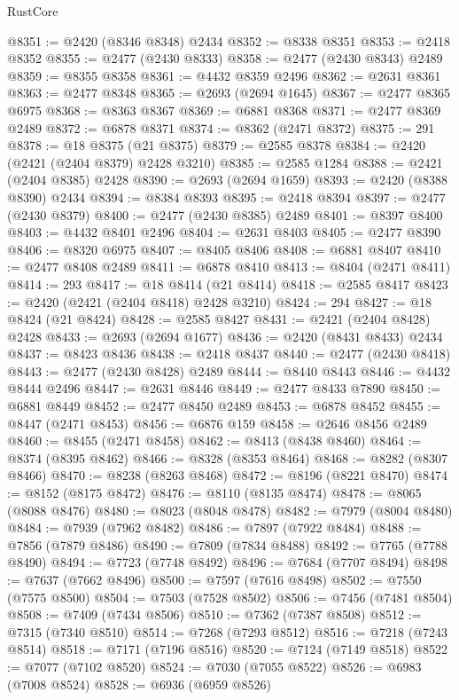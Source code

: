 \begin{lexlean}{RustCore}
\begin{coremodule}
@8351 := @2420 (@8346 @8348) @2434
@8352 := @8338 @8351
@8353 := @2418 @8352
@8355 := @2477 (@2430 @8333)
@8358 := @2477 (@2430 @8343) @2489
@8359 := @8355 @8358
@8361 := @4432 @8359 @2496
@8362 := @2631 @8361
@8363 := @2477 @8348
@8365 := @2693 (@2694 @1645)
@8367 := @2477 @8365 @6975
@8368 := @8363 @8367
@8369 := @6881 @8368
@8371 := @2477 @8369 @2489
@8372 := @6878 @8371
@8374 := @8362 (@2471 @8372)
@8375 := 291
@8378 := @18 @8375 (@21 @8375)
@8379 := @2585 @8378
@8384 := @2420 (@2421 (@2404 @8379) @2428 @3210)
@8385 := @2585 @1284
@8388 := @2421 (@2404 @8385) @2428
@8390 := @2693 (@2694 @1659)
@8393 := @2420 (@8388 @8390) @2434
@8394 := @8384 @8393
@8395 := @2418 @8394
@8397 := @2477 (@2430 @8379)
@8400 := @2477 (@2430 @8385) @2489
@8401 := @8397 @8400
@8403 := @4432 @8401 @2496
@8404 := @2631 @8403
@8405 := @2477 @8390
@8406 := @8320 @6975
@8407 := @8405 @8406
@8408 := @6881 @8407
@8410 := @2477 @8408 @2489
@8411 := @6878 @8410
@8413 := @8404 (@2471 @8411)
@8414 := 293
@8417 := @18 @8414 (@21 @8414)
@8418 := @2585 @8417
@8423 := @2420 (@2421 (@2404 @8418) @2428 @3210)
@8424 := 294
@8427 := @18 @8424 (@21 @8424)
@8428 := @2585 @8427
@8431 := @2421 (@2404 @8428) @2428
@8433 := @2693 (@2694 @1677)
@8436 := @2420 (@8431 @8433) @2434
@8437 := @8423 @8436
@8438 := @2418 @8437
@8440 := @2477 (@2430 @8418)
@8443 := @2477 (@2430 @8428) @2489
@8444 := @8440 @8443
@8446 := @4432 @8444 @2496
@8447 := @2631 @8446
@8449 := @2477 @8433 @7890
@8450 := @6881 @8449
@8452 := @2477 @8450 @2489
@8453 := @6878 @8452
@8455 := @8447 (@2471 @8453)
@8456 := @6876 @159
@8458 := @2646 @8456 @2489
@8460 := @8455 (@2471 @8458)
@8462 := @8413 (@8438 @8460)
@8464 := @8374 (@8395 @8462)
@8466 := @8328 (@8353 @8464)
@8468 := @8282 (@8307 @8466)
@8470 := @8238 (@8263 @8468)
@8472 := @8196 (@8221 @8470)
@8474 := @8152 (@8175 @8472)
@8476 := @8110 (@8135 @8474)
@8478 := @8065 (@8088 @8476)
@8480 := @8023 (@8048 @8478)
@8482 := @7979 (@8004 @8480)
@8484 := @7939 (@7962 @8482)
@8486 := @7897 (@7922 @8484)
@8488 := @7856 (@7879 @8486)
@8490 := @7809 (@7834 @8488)
@8492 := @7765 (@7788 @8490)
@8494 := @7723 (@7748 @8492)
@8496 := @7684 (@7707 @8494)
@8498 := @7637 (@7662 @8496)
@8500 := @7597 (@7616 @8498)
@8502 := @7550 (@7575 @8500)
@8504 := @7503 (@7528 @8502)
@8506 := @7456 (@7481 @8504)
@8508 := @7409 (@7434 @8506)
@8510 := @7362 (@7387 @8508)
@8512 := @7315 (@7340 @8510)
@8514 := @7268 (@7293 @8512)
@8516 := @7218 (@7243 @8514)
@8518 := @7171 (@7196 @8516)
@8520 := @7124 (@7149 @8518)
@8522 := @7077 (@7102 @8520)
@8524 := @7030 (@7055 @8522)
@8526 := @6983 (@7008 @8524)
@8528 := @6936 (@6959 @8526)

\end{coremodule}
\end{lexlean}
